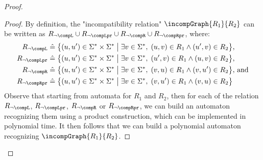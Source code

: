 \begin{proof}
\begin{proof}
    By definition, the "incompatibility relation" $\incompGraph{R_1}{R_2}$ can be written as
	$R_{\neg\compL} \cup R_{\neg\compLpr} \cup R_{\neg\compR} \cup R_{\neg\compRpr}$, where:
	\begin{align*}
        R_{\neg\compL} &\defeq \big\{ (u,u') \in \Sigma^* \times \Sigma^* \;\big\vert\; \exists v \in \Sigma^*,\; (u,v) \in R_1 \land (u',v) \in R_2 \big\} \text{,}\\
        R_{\neg\compLpr} &\defeq \big\{ (u,u') \in \Sigma^* \times \Sigma^* \;\big\vert\; \exists v \in \Sigma^*,\; (u',v) \in R_1 \land (u,v) \in R_2 \big\} \text{,}\\
        R_{\neg\compR} &\defeq \big\{ (u,u') \in \Sigma^* \times \Sigma^* \;\big\vert\; \exists v \in \Sigma^*,\; (v,u) \in R_1 \land (v,u') \in R_2 \big\} \text{, and}\\
        R_{\neg\compRpr} &\defeq \big\{ (u,u') \in \Sigma^* \times \Sigma^* \;\big\vert\; \exists v \in \Sigma^*,\; (v,u') \in R_1 \land (v,u) \in R_2 \big\}
    \end{align*}
    Observe that starting from automata for $R_1$ and $R_2$, then for each
	of the relation $R_{\neg\compL}$, $R_{\neg\compLpr}$, $R_{\neg\compR}$ or $R_{\neg\compRpr}$, we can build an automaton recognizing them
	using a product construction, which can be implemented in polynomial time.
    It then follows that we can build a polynomial automaton recognizing
    $\incompGraph{R_1}{R_2}$.
\end{proof}


\end{proof}
